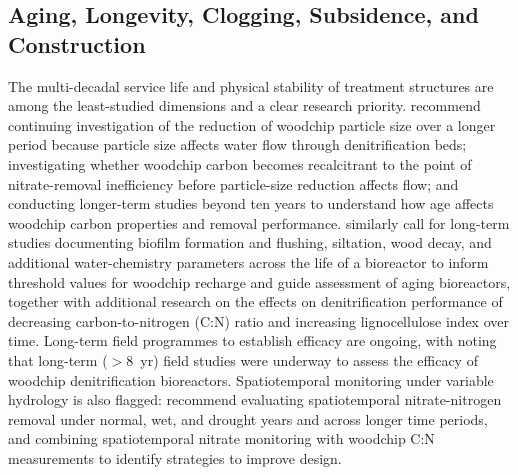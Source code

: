\documentclass[11pt]{article}
\begin{document}
\subsection{Aging, Longevity, Clogging, Subsidence, and Construction}
The multi-decadal service life and physical stability of treatment structures are among the least-studied dimensions and a clear research priority. \textcite{Ghane2018} recommend continuing investigation of the reduction of woodchip particle size over a longer period because particle size affects water flow through denitrification beds; investigating whether woodchip carbon becomes recalcitrant to the point of nitrate-removal inefficiency before particle-size reduction affects flow; and conducting longer-term studies beyond ten years to understand how age affects woodchip carbon properties and removal performance. \textcite{Christianson2020} similarly call for long-term studies documenting biofilm formation and flushing, siltation, wood decay, and additional water-chemistry parameters across the life of a bioreactor to inform threshold values for woodchip recharge and guide assessment of aging bioreactors, together with additional research on the effects on denitrification performance of decreasing carbon-to-nitrogen (C:N) ratio and increasing lignocellulose index over time. Long-term field programmes to establish efficacy are ongoing, with \textcite{Greenan2009} noting that long-term ($>$8~yr) field studies were underway to assess the efficacy of woodchip denitrification bioreactors. Spatiotemporal monitoring under variable hydrology is also flagged: \textcite{Hartfiel2023b} recommend evaluating spatiotemporal nitrate-nitrogen removal under normal, wet, and drought years and across longer time periods, and combining spatiotemporal nitrate monitoring with woodchip C:N measurements to identify strategies to improve design.
\end{document}
